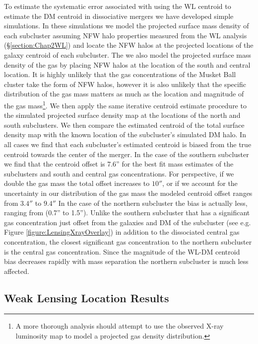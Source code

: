 To estimate the systematic error associated with using the WL centroid to estimate the DM centroid in dissociative mergers we have developed simple simulations.
In these simulations we model the projected surface mass density of each subcluster assuming NFW halo properties measured from the WL analysis (\S\ref{section:Chap2WL}) and locate the NFW halos at the projected locations of the galaxy centroid of each subcluster.
The we also model the projected surface mass density of the gas by placing NFW halos at the location of the south and central location.
It is highly unlikely that the gas concentrations of the Musket Ball cluster take the form of NFW halos, however it is also unlikely that the specific distribution of the gas mass matters as much as the location and magnitude of the gas mass\footnote{A more thorough analysis should attempt to use the observed X-ray luminosity map to model a projected gas density distribution.}.
We then apply the same iterative centroid estimate procedure to the simulated projected surface density map at the locations of the north and south subclusters.
We then compare the estimated centroid of the total surface density map with the known location of the subcluster's simulated DM halo.
In all cases we find that each subcluster's estimated centroid is biased from the true centroid towards the center of the merger.
In the case of the southern subcluster we find that the centroid offset is 7.6'' for the best fit mass estimates of the subclusters and south and central gas concentrations.
For perspective, if we double the gas mass the total offset increases to $10''$, or if we account for the uncertainty in our distribution of the gas mass the modeled centroid offset ranges from $3.4''$ to $9.4''$
In the case of the northern subcluster the bias is actually less, ranging from (0.7'' to 1.5'').
Unlike the southern subcluster that has a significant gas concentration just offset from the galaxies and DM of the subcluster (see e.g. Figure \ref{figure:LensingXrayOverlay}) in addition to the dissociated central gas concentration, the closest significant gas concentration to the northern subcluster is the central gas concentration.
Since the magnitude of the WL-DM centroid bias decreases rapidly with mass separation the northern subcluster is much less affected.

\subsection{Weak Lensing Location Results}


